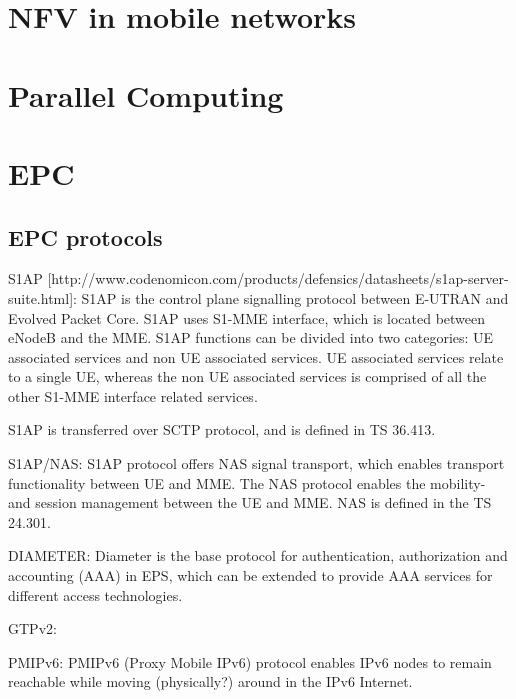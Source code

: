 
\section{NFV in mobile networks}
\label{section:NFV}


\section{Parallel Computing}
\label{section:parallel-computing}


\section{EPC}
\label{sec:epc}

\subsection{EPC protocols}
\label{sec:epc-protocols}
S1AP [http://www.codenomicon.com/products/defensics/datasheets/s1ap-server-suite.html]:
S1AP is the control plane signalling protocol between E-UTRAN and Evolved Packet Core. S1AP uses S1-MME interface, which is located between eNodeB and the MME. S1AP functions can be divided into two categories: UE associated services and non UE associated services. UE associated services relate to a single UE, whereas the non UE associated services is comprised of all the other S1-MME interface related services.

S1AP is transferred over SCTP protocol, and is defined in TS 36.413.

S1AP/NAS:
S1AP protocol offers NAS signal transport, which enables transport functionality between UE and MME. The NAS protocol enables the mobility- and session management between the UE and MME. NAS is defined in the TS 24.301.

DIAMETER:
Diameter is the base protocol for authentication, authorization and accounting (AAA) in EPS, which can be extended to provide AAA services for different access technologies.

GTPv2:

PMIPv6:
PMIPv6 (Proxy Mobile IPv6) protocol enables IPv6 nodes to remain reachable while moving (physically?) around in the IPv6 Internet.

